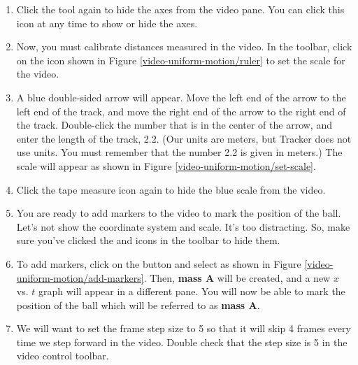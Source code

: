 \begin{enumerate}
	\item Click the  tool again to hide the axes from the video pane. You can click this icon at any time to show or hide the axes.

	\item Now, you must calibrate distances measured in the video. In the toolbar, click on the  icon shown in Figure \ref{video-uniform-motion/ruler} to set the scale for the video.
		

	\item A blue double-sided arrow will appear. Move the left end of the arrow to the left end of the track, and move the right end of the arrow to the right end of the track. Double-click the number that is in the center of the arrow, and enter the length of the track, 2.2. (Our units are meters, but Tracker does not use units. You must remember that the number 2.2 is given in meters.) The scale will appear as shown in Figure \ref{video-uniform-motion/set-scale}.

	
	\item Click the tape measure icon again to hide the blue scale from the video.

	\item You are ready to add markers to the video to mark the position of the ball. Let's not show the coordinate system and scale. It's too distracting. So, make sure you've clicked the  and  icons in the toolbar to hide them.
		
	\item To add markers, click on the  button and select  as shown in Figure \ref{video-uniform-motion/add-markers}. Then, {\bf mass A} will be created, and a new $x$ vs. $t$ graph will appear in a different pane. You will now be able to mark the position of the ball which will be referred to as {\bf mass A}.

	
	\item We will want to set the frame step size to 5 so that it will skip 4 frames every time we step forward in the video. Double check that the step size is 5 in the video control toolbar.


\end{enumerate}
